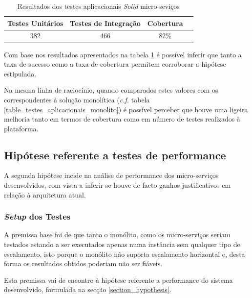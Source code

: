 \begin{table}[h]
\centering
\caption{Resultados dos testes aplicacionais \emph{Solid} micro-seviços}
\vspace{0.5cm}
\label{table_testes_aplicacionais_micro_services}
\begin{tabular}{c|c|c|c} 
Testes Unitários & Testes de Integração & Cobertura \\
\hline                          
382 & 466 & 82\% \\
\end{tabular}
\end{table}

Com base nos resultados apresentados na tabela \ref{table_testes_aplicacionais_micro_services} é possível inferir que tanto a taxa de sucesso como a taxa de cobertura permitem corroborar a hipótese estipulada.

Na mesma linha de raciocínio, quando comparados estes valores com os correspondentes à solução monolítica (\emph{c.f.} tabela \ref{table_testes_aplicacionais_monolito}) é possível perceber que houve uma ligeira melhoria tanto em termos de cobertura como em número de testes realizados à plataforma.

\subsection{Hipótese referente a testes de performance}
A segunda hipótese incide na análise de performance dos micro-serviços desenvolvidos, com vista a inferir se houve de facto ganhos justificativos em relação à arquitetura atual.

\subsubsection*{\emph{Setup} dos Testes \label{section_setup_testes}}

A premissa base foi de que tanto o monólito, como os micro-serviços seriam testados estando a ser executados apenas numa instância sem qualquer tipo de escalamento, isto porque o monólito não suporta escalamento horizontal e, desta forma os resultados obtidos poderiam não ser fiáveis. 

Esta premissa vai de encontro à hipótese referente a performance do sistema desenvolvido, formulada na secção \ref{section_hypothesis}.

